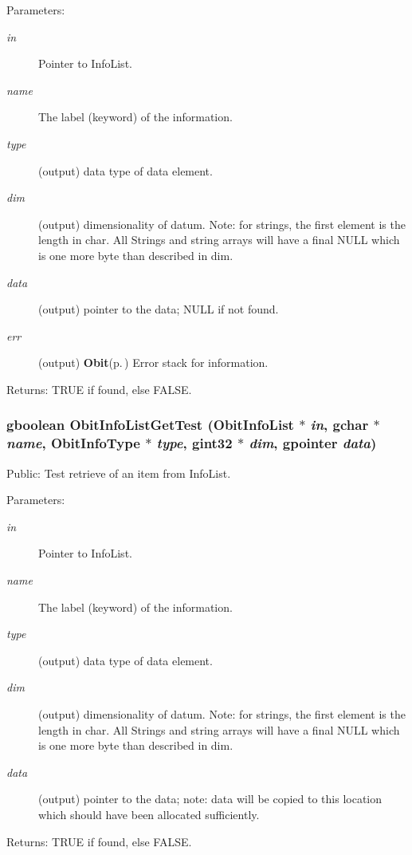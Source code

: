 \begin{Desc}
\item[Parameters:]
\begin{description}
\item[{\em in}]Pointer to Info\-List. \item[{\em name}]The label (keyword) of the information. \item[{\em type}](output) data type of data element. \item[{\em dim}](output) dimensionality of datum. Note: for strings, the first element is the length in char. All Strings and string arrays will have a final NULL which is one more byte than described in dim. \item[{\em data}](output) pointer to the data; NULL if not found. \item[{\em err}](output) {\bf Obit}{\rm (p.\,\pageref{structObit})} Error stack for information. \end{description}
\end{Desc}
\begin{Desc}
\item[Returns:]TRUE if found, else FALSE. \end{Desc}
\subsubsection{\setlength{\rightskip}{0pt plus 5cm}gboolean Obit\-Info\-List\-Get\-Test ({\bf Obit\-Info\-List} $\ast$ {\em in}, gchar $\ast$ {\em name}, Obit\-Info\-Type $\ast$ {\em type}, gint32 $\ast$ {\em dim}, gpointer {\em data})}\label{ObitInfoList_8h_a15}


Public: Test retrieve of an item from Info\-List. 

\begin{Desc}
\item[Parameters:]
\begin{description}
\item[{\em in}]Pointer to Info\-List. \item[{\em name}]The label (keyword) of the information. \item[{\em type}](output) data type of data element. \item[{\em dim}](output) dimensionality of datum. Note: for strings, the first element is the length in char. All Strings and string arrays will have a final NULL which is one more byte than described in dim. \item[{\em data}](output) pointer to the data; note: data will be copied to this location which should have been allocated sufficiently. \end{description}
\end{Desc}
\begin{Desc}
\item[Returns:]TRUE if found, else FALSE. \end{Desc}
